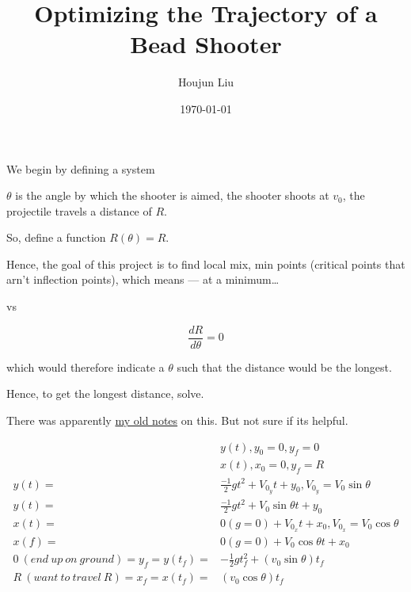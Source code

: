 \documentclass[letterpaper]{article}
\author{Houjun Liu}
\date{\today}
\title{Optimizing the Trajectory of a Bead Shooter}
\renewcommand{\tableofcontents}{}
\begin{document}
\tableofcontents

We begin by defining a system

\(\theta\) is the angle by which the shooter is aimed, the shooter shoots at \(v_0\), the projectile travels a distance of \(R\).

So, define a function \(R(\theta) = R\).

Hence, the goal of this project is to find local mix, min points (critical points that arn't inflection points), which means --- at a minimum\ldots{}

vs

\begin{equation}
    \frac{dR}{d\theta} = 0
\end{equation}

which would therefore indicate a \(\theta\) such that the distance would be the longest.

Hence, to get the longest distance, solve.

There was apparently \href{https://www.notion.so/shabangsystems/Projectiles-Trajectories-d9d491162e6844f9aefd2cc6dda8d334}{my old notes} on this. But not sure if its helpful.


\begin{align}
    &y(t), y_0=0, y_f=0 \\
&x(t), x_0=0, y_f=R \\
y(t) =& \frac{-1}{2} gt^2 + V_0_y t + y_0, V_0_y =  V_0 \sin\theta \\
y(t) =& \frac{-1}{2} gt^2 + V_0 \sin\theta t + y_0\\
x(t) =& 0 (g=0) + V_0_x t + x_0, V_0_x = V_0 \cos\theta  \\
x(f) =& 0 (g=0) + V_0 \cos\theta t + x_0 \\
0\ (end\ up\ on\ ground) = y_f = y(t_f) =& -\frac{1}{2}g t_f^2 + (v_0\sin\theta)t_f \\
R\ (want\ to\ travel\ R) = x_f = x(t_f) =& (v_0\cos\theta)t_f \\
\end{align}
\end{document}
